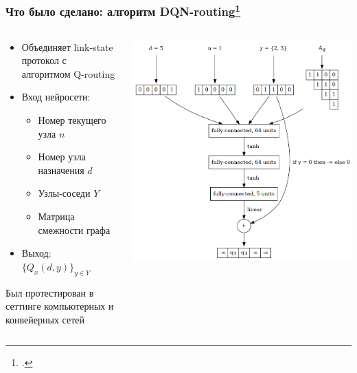 \documentclass{beamer}
\begin{document}

\begin{frame}
  \frametitle{Что было сделано: алгоритм DQN-routing\footcite{mukhutdinov2019multi}}
  \begin{columns}
    \begin{column}{0.5\textwidth}
      \begin{itemize}
      \item Объединяет link-state протокол с алгоритмом Q-routing
      \item Вход нейросети:
        \begin{itemize}
        \item Номер текущего узла $n$
        \item Номер узла назначения $d$
        \item Узлы-соседи $Y$
        \item Матрица смежности графа
        \end{itemize}
      \item Выход: $\{ Q_x(d, y) \}_{y \in Y}$
      \end{itemize}
      Был протестирован в сеттинге компьютерных и конвейерных сетей
    \end{column}
    \begin{column}{0.5\textwidth}
      \begin{center}
        \includegraphics[width=\textwidth]{nn-2}
      \end{center}
    \end{column}
  \end{columns}
\end{frame}
\end{document}
